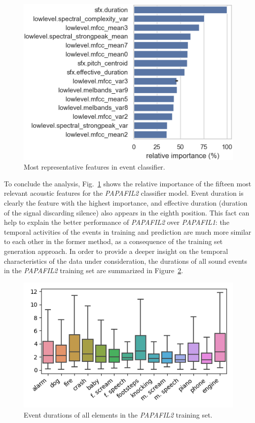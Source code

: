 \begin{figure}[t]
  \centering
  \centerline{\includegraphics[width=\columnwidth]{Figures/SELD/importance_new_tight.png}}
  \caption{Most representative features in event classifier.}
  \label{fig:importance}
\end{figure}

To conclude the analysis, Fig.~\ref{fig:importance} shows the relative importance of the fifteen most relevant acoustic features for the \textit{PAPAFIL2} classifier model.
Event duration is clearly the feature with the highest importance, and effective duration (duration of the signal discarding silence) also appears in the eighth position.
This fact can help to explain the better performance of \textit{PAPAFIL2} over \textit{PAPAFIL1}: the temporal activities of the events in training and prediction are much more similar to each other in the former method, as a consequence of the training set generation approach. 
In order to provide a deeper insight on the temporal characteristics of the data under consideration, the durations of all sound events in the \textit{PAPAFIL2} training set are summarized in Figure~\ref{fig:eventdurations}. 

\begin{figure}[t]
  \centering
  \centerline{\includegraphics[width=\columnwidth]{Figures/SELD/event_durations.png}}
  \caption{Event durations of all elements in the \textit{PAPAFIL2} training set.}
  \label{fig:eventdurations}
\end{figure}


